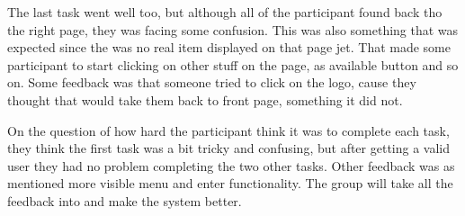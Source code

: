 The last task went well too, but although all of the participant found back tho the right page, they was facing some confusion. This was also something that was expected since the was no real item displayed on that page jet. That made some participant to start clicking on other stuff on the page, as available button and so on. Some feedback was that someone tried to click on the logo, cause they thought that would take them back to front page, something it did not. 

On the question of how hard the participant think it was to complete each task, they think the first task was a bit tricky and confusing, but after getting a valid user they had no problem completing the two other tasks. Other feedback was as mentioned more visible menu and enter functionality. The group will take all the feedback into and make the system better. 

